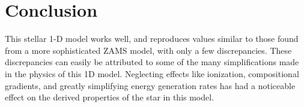 \documentclass[12pt]{article}
\begin{document}
\begin{table}[htbp]
\begin{center}
\label{tab:compare}

\end{center}
\end{table}

\section{Conclusion} \label{sec:conclusion}
This stellar 1-D model works well, and reproduces values similar to those found from a more sophisticated ZAMS model, with only a few discrepancies. These discrepancies can easily be attributed to some of the many simplifications made in the physics of this 1D model. Neglecting effects like ionization, compositional gradients, and greatly simplifying energy generation rates has had a noticeable effect on the derived properties of the star in this model.



\end{document}

